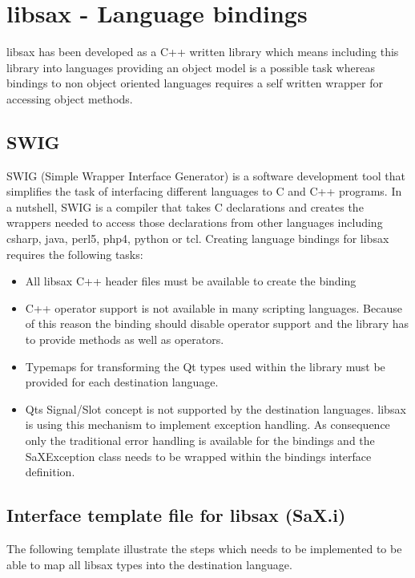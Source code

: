 \chapter{libsax - Language bindings}
\minitoc

libsax has been developed as a C++ written library which means
including this library into languages providing an object model
is a possible task whereas bindings to non object oriented languages
requires a self written wrapper for accessing object methods.

\section{SWIG}

SWIG (Simple Wrapper Interface Generator) is a software development tool
that simplifies the task of
interfacing different languages to C and C++ programs. In a nutshell,
SWIG is a compiler that takes C declarations and creates the wrappers
needed to access those declarations from other languages
including csharp, java, perl5, php4, python or tcl. Creating language
bindings for libsax requires the following tasks:

\begin{itemize}
\item All libsax C++ header files must be available to create the binding
\item C++ operator support is not available in many scripting languages.
      Because of this reason the binding should disable operator support
      and the library has to provide methods as well as operators.
\item Typemaps for transforming the Qt types used within the library
      must be provided for each destination language.
\item Qts Signal/Slot concept is not supported by the destination languages.
      libsax is using this mechanism to implement exception handling.
      As consequence only the traditional error handling is available for
      the bindings and the SaXException class needs to be wrapped within
	  the bindings interface definition.
\end{itemize}

\newpage

\section{Interface template file for libsax (SaX.i)}

The following template illustrate the steps which needs to be
implemented to be able to map all libsax types into the destination
language.

